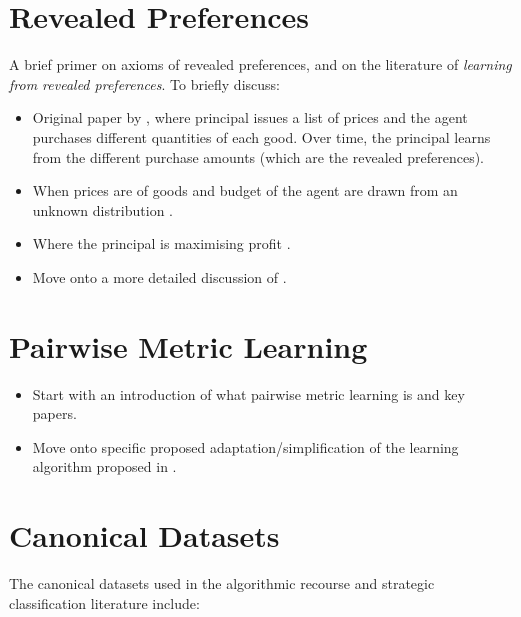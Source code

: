 \section{Revealed Preferences}
A brief primer on axioms of revealed preferences, and on the literature of \textit{learning from revealed preferences}. To briefly discuss:

\begin{itemize}
	\item Original paper by \textcite{beigmanLearningRevealedPreference2006}, where principal issues a list of prices and the agent purchases different quantities of each good. Over time, the principal learns from the different purchase amounts (which are the revealed preferences).
	\item When prices are of goods and budget of the agent are drawn from an unknown distribution \citep{zadimoghaddamEfficientlyLearningRevealed2012, balcanLearningEconomicParameters2014}.
	\item Where the principal is maximising profit \citep{aminOnlineLearningProfit2015, rothWatchLearnOptimizing2016}.
	\item Move onto a more detailed discussion of \textcite{dongStrategicClassificationRevealed2018}.
\end{itemize}


\section{Pairwise Metric Learning}
\begin{itemize}
	\item Start with an introduction of what pairwise metric learning is and key papers.
	\item Move onto specific proposed adaptation/simplification of the learning algorithm proposed in \textcite{canalOneAllSimultaneous2022}.
\end{itemize}


\section{Canonical Datasets}
The canonical datasets used in the algorithmic recourse and strategic classification literature include:

